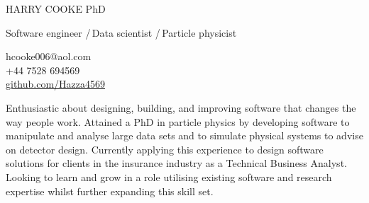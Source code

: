 \documentclass[a4paper]{article}
\newcommand\bodysize{\fontsize{11}{13}}
\newcommand\htwosize{\fontsize{12}{15}}
\newcommand\hlseptwo{{\color{hl}/}\,}
\newcommand\intersectionspacing{0.3em}
\newcommand\sidetitle[2][0em]{%
  \fontfamily{phv}\fontseries{b}\fontsize{12}{13}\selectfont\color{hl}
  \hspace{.1em}
  \rotatebox[origin=c]{90}{\hspace{#1}#2}
}
\newcommand\lefttitleblockvpad{\vspace{.3em}}
\newcommand\lefttitleblock[3]{%
  \colorbox{#1}{%
    \begin{minipage}[c]{.04\textwidth}
      \lefttitleblockvpad
      \sidetitle{#2}
      \lefttitleblockvpad
    \end{minipage}{\color{hl}\vrule width 1pt}%
    \begin{minipage}[c]{.005\textwidth}\hfill\end{minipage}
    \begin{minipage}[c]{.94\textwidth}
      \lefttitleblockvpad
      #3
      \lefttitleblockvpad
    \end{minipage}%
  }
}
\newcommand\cvtitle{HARRY COOKE\xspace}
\newcommand\cvsubtitle{
  Software engineer \hlseptwo Data scientist \hlseptwo Particle physicist
\xspace}
\begin{document}
\pagestyle{pageother}
\thispagestyle{pageone}

\begin{minipage}{\textwidth}
  \begin{minipage}[b]{0.7\textwidth}
    {\fontsize{28}{25}\selectfont\color{hl}%
      \cvtitle 
    }{\fontsize{19}{20}\selectfont%
      \hspace{5pt}PhD
    }\\[.4em]
    {\htwosize\selectfont%
      \cvsubtitle
    }
  \end{minipage}%
  \begin{minipage}[b]{0.3\textwidth}
    \raggedleft{}\bodysize\selectfont%
      hcooke006@aol.com \\[0.1em]
      +44 7528 694569 \\[0.1em]
      \href{https://github.com/Hazza4569}{github.com/Hazza4569}
  \end{minipage}
\end{minipage}

\vspace{0.5em}

\lefttitleblock{bg2}{SUMMARY}{%
    \fontseries{m}\fontshape{n}\bodysize\selectfont%
    Enthusiastic about designing, building, and improving software that changes
    the way people work. 
    Attained a PhD in particle physics by developing software to
    manipulate and analyse large data sets
    and to simulate physical systems to advise on detector design.
    Currently applying this experience to design software solutions for clients in
    the insurance industry as a Technical Business Analyst.
    Looking to learn and grow in a role utilising existing software and research
    expertise whilst further expanding this skill set.
}\\[\intersectionspacing]
\end{document}

